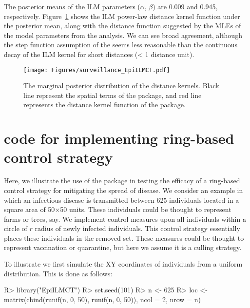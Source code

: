 \documentclass[nojss,shortnames]{jss}
\begin{document}
The posterior means of the ILM parameters ($\alpha$, $\beta$) are 0.009 and 0.945, respectively. Figure~\ref{surveillance_EpILMCT} shows the ILM power-law distance kernel function under the posterior mean, along with the distance function suggested by the MLEs of the model parameters from the  analysis. We can see broad agreement, although the step function assumption of the  seems less reasonable than the continuous decay of the ILM kernel for short distances (< 1 distance unit).


\begin{figure}[t]
\begin{center}
\texttt{[image: Figures/surveillance\_EpiILMCT.pdf]}
\caption{The marginal posterior distribution of the distance kernels. Black line represent the spatial terms of the  package, and red line represents the distance kernel function of the  package.}
\label{surveillance_EpILMCT}
\end{center}
\end{figure}








\newpage
\section[C.]{ code for implementing ring-based control strategy}\label{appendix.3}

Here, we illustrate the use of the  package in testing the efficacy of a ring-based control strategy for mitigating the spread of disease. We consider an example in which an infectious disease is transmitted between 625 individuals located in a square area of 50$\times$50 units. These individuals could be thought to represent farms or trees, say. We implement control measures upon all individuals within a circle of $r$ radius of newly infected individuals. This control strategy essentially places these individuals in the removed set. These measures could be thought to represent vaccination or quarantine, but here we assume it is a culling strategy.

To illustrate we first simulate the XY coordinates of individuals from a uniform distribution. This is done as follows:
\begin{Sinput}
R> library("EpiILMCT")
R> set.seed(101)
R> n <- 625
R> loc <- matrix(cbind(runif(n, 0, 50), runif(n, 0, 50)), ncol = 2, nrow = n)
\end{Sinput}
\end{document}
